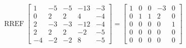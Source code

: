\begin{exerciseAnswer} 


\[\operatorname{RREF} \left[\begin{array}{ccccc}
1 & -5 & -5 & -13 & -3 \\
0 & 2 & 2 & 4 & -4 \\
2 & -3 & -3 & -12 & -4 \\
2 & 2 & 2 & -2 & -5 \\
-4 & -2 & -2 & 8 & -5
\end{array}\right] = \left[\begin{array}{ccccc}
1 & 0 & 0 & -3 & 0 \\
0 & 1 & 1 & 2 & 0 \\
0 & 0 & 0 & 0 & 1 \\
0 & 0 & 0 & 0 & 0 \\
0 & 0 & 0 & 0 & 0
\end{array}\right] \]



\end{exerciseAnswer}

